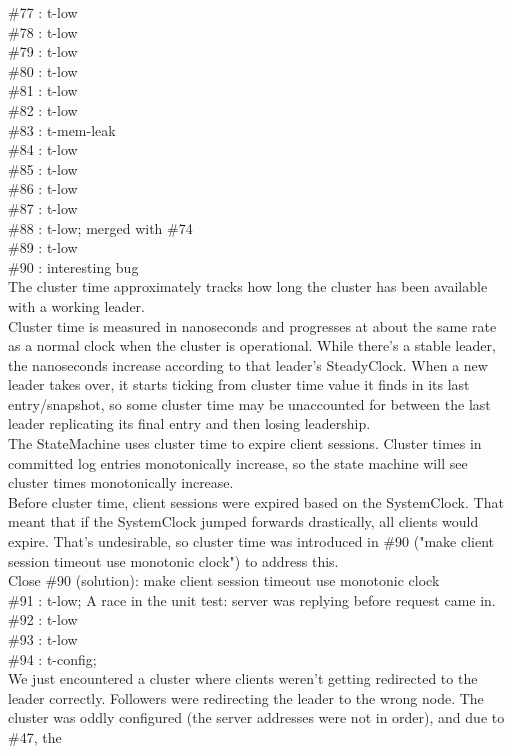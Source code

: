 \#77 : t-low\\
\#78 : t-low\\
\#79 : t-low\\
\#80 : t-low\\
\#81 : t-low\\
\#82 : t-low\\
\#83 : t-mem-leak\\
\#84 : t-low\\
\#85 : t-low\\
\#86 : t-low\\
\#87 : t-low\\
\#88 : t-low; merged with \#74\\
\#89 : t-low\\
\#90 : interesting bug\\
The cluster time approximately tracks how long the cluster has been
available with a working leader.\\
Cluster time is measured in nanoseconds and progresses at about the same
rate as a normal clock when the cluster is operational. While there's a
stable leader, the nanoseconds increase according to that leader's
SteadyClock. When a new leader takes over, it starts ticking from cluster
time value it finds in its last entry/snapshot, so some cluster time may be
unaccounted for between the last leader replicating its final entry and then
losing leadership.\\
The StateMachine uses cluster time to expire client sessions. Cluster times
in committed log entries monotonically increase, so the state machine will
see cluster times monotonically increase.\\
Before cluster time, client sessions were expired based on the SystemClock.
That meant that if the SystemClock jumped forwards drastically, all clients
would expire. That's undesirable, so cluster time was introduced in \#90
("make client session timeout use monotonic clock") to address this.\\
Close \#90 (solution): make client session timeout use monotonic clock\\
\#91 : t-low; A race in the unit test: server was replying before request came in.\\
\#92 : t-low\\
\#93 : t-low\\
\#94 : t-config;\\
We just encountered a cluster where clients weren't getting redirected to the leader 
correctly. Followers were redirecting the leader to the wrong node. The cluster 
was oddly configured (the server addresses were not in order), and due to \#47, the 
